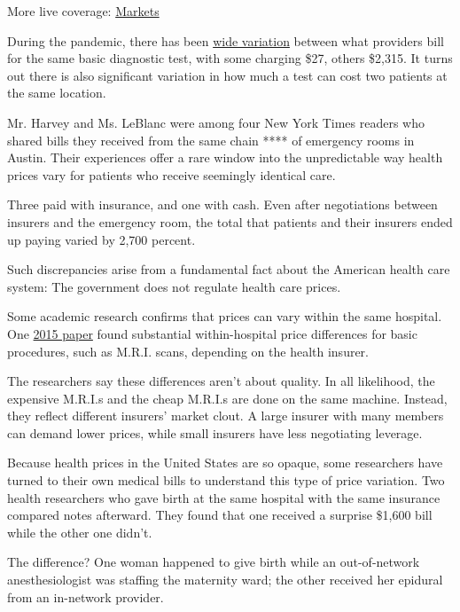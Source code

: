 More live coverage:
\href{https://www.nytimes3xbfgragh.onion/live/2020/09/11/business/stock-market-today-coronavirus?action=click\&pgtype=Article\&state=default\&region=MAIN_CONTENT_1\&context=storylines_live_updates}{Markets}

During the pandemic, there has been
\href{https://www.nytimes3xbfgragh.onion/2020/06/16/upshot/coronavirus-test-cost-varies-widely.html}{wide
variation} between what providers bill for the same basic diagnostic
test, with some charging \$27, others \$2,315. It turns out there is
also significant variation in how much a test can cost two patients at
the same location.

Mr. Harvey and Ms. LeBlanc were among four New York Times readers who
shared bills they received from the same chain **** of emergency rooms
in Austin. Their experiences offer a rare window into the unpredictable
way health prices vary for patients who receive seemingly identical
care.

Three paid with insurance, and one with cash. Even after negotiations
between insurers and the emergency room, the total that patients and
their insurers ended up paying varied by 2,700 percent.

Such discrepancies arise from a fundamental fact about the American
health care system: The government does not regulate health care prices.

Some academic research confirms that prices can vary within the same
hospital. One \href{https://www.nber.org/papers/w21815}{2015 paper}
found substantial within-hospital price differences for basic
procedures, such as M.R.I. scans, depending on the health insurer.

The researchers say these differences aren't about quality. In all
likelihood, the expensive M.R.I.s and the cheap M.R.I.s are done on the
same machine. Instead, they reflect different insurers' market clout. A
large insurer with many members can demand lower prices, while small
insurers have less negotiating leverage.

Because health prices in the United States are so opaque, some
researchers have turned to their own medical bills to understand this
type of price variation. Two health researchers who gave birth at the
same hospital with the same insurance compared notes afterward. They
found that one received a surprise \$1,600 bill while the other one
didn't.

The difference? One woman happened to give birth while an out-of-network
anesthesiologist was staffing the maternity ward; the other received her
epidural from an in-network provider.

